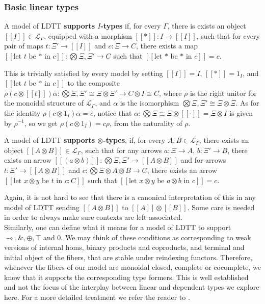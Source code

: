   \subsubsection{Basic linear types}
  \begin{defn}
  A model of LDTT \textbf{supports $I$-types} if, for every $\Gamma$, there is exists an object $[[I]] \in \mathcal{L}_{\Gamma}$, equipped with a morphism $[[*]] : I \to [[I]]$, such that for every pair of maps $t : \Xi' \to [[I]]$ and $c : \Xi \to C$, there exists a map $[[\text{let $t$ be * in $c$}]] : \bigotimes \Xi, \Xi' \to C$ such that $[[\text{let * be * in $c$}]] = c$.
\end{defn}
This is trivially satisfied by every model by setting $[[I]] = I$, $[[*]] = 1_{I}$, and $[[\text{let $t$ be * in $c$}]]$ to the composite $\rho (c \otimes [[t]]) \alpha  : \bigotimes \Xi, \Xi' \cong \Xi \otimes \Xi' \to C \otimes I \cong C$, where $\rho$ is the right unitor for the monoidal structure of $\mathcal{L}_{\Gamma}$, and $\alpha$ is the isomorphism $\bigotimes \Xi, \Xi' \cong \Xi \otimes \Xi$. As for the identity $\rho(c \otimes 1_{I}) \alpha = c$, notice that $\alpha : \bigotimes \Xi \cong \Xi \otimes [[\cdot]] = \Xi \otimes I$ is given by $\rho^{-1}$, so we get $\rho (c \otimes 1_I) = c \rho$, from the naturality of $\rho$.\\
\begin{defn}
  A model of LDTT \textbf{supports $\otimes$-types}, if, for every $A, B \in \mathcal{L}_{\Gamma}$, there exists an object $[[A \otimes B]] \in \mathcal{L}_{\Gamma}$, such that for any arrows $a : \Xi \to A$, $b : \Xi' \to B$, there exists an arrow $[[(a \otimes b)]] : \bigotimes \Xi, \Xi' \to [[A \otimes B]]$ and for arrows $t : \Xi' \to [[A \otimes B]]$ and $c : \bigotimes \Xi \otimes A \otimes B \to C$, there exists an arrow $[[\text{let $x \otimes y$ be $t$ in $c : C$}]]$ such that $[[\text{let $x \otimes y$ be $a \otimes b$ in $c$}]] = c$.
\end{defn}
Again, it is not hard to see that there is a canonical interpretation of this in any model of LDTT sending $[[A \otimes B]]$ to $[[A]] \otimes [[B]]$. Some care is needed in order to always make sure contexts are left associated.\\
Similarly, one can define what it means for a model of LDTT to support $\multimap, \&, \oplus, \top$ and $0$. We may think of these conditions as corresponding to weak versions of internal homs, binary products and coproducts, and terminal and initial object of the fibers, that are stable under reindexing functors. Therefore, whenever the fibers of our model are monoidal closed, complete or cocomplete, we know that it supports the corresponding type formers. This is well established and not the focus of the interplay between linear and dependent types we explore here. For a more detailed treatment we refer the reader to \cite{mellies}.
